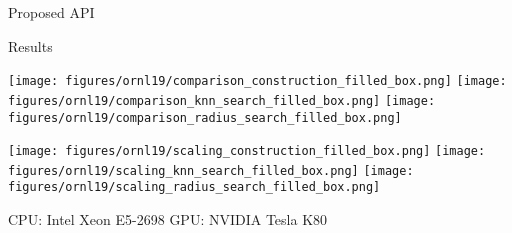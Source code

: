 \documentclass[final,hyperref={pdfpagelabels=false}]{beamer}
\begin{document}
\begin{frame}[t,fragile]
\begin{columns}[t]
\begin{column}{.480\textwidth}
\begin{block}{\centering Proposed API}
\end{block}

\begin{block}{\centering Results}

\texttt{[image: figures/ornl19/comparison\_construction\_filled\_box.png]}
\texttt{[image: figures/ornl19/comparison\_knn\_search\_filled\_box.png]}
\texttt{[image: figures/ornl19/comparison\_radius\_search\_filled\_box.png]}

\texttt{[image: figures/ornl19/scaling\_construction\_filled\_box.png]}
\texttt{[image: figures/ornl19/scaling\_knn\_search\_filled\_box.png]}
\texttt{[image: figures/ornl19/scaling\_radius\_search\_filled\_box.png]}

\begin{center}
  \small
  CPU: Intel Xeon E5-2698 \qquad GPU: NVIDIA Tesla K80
\end{center}


\end{block}


\end{column}
\end{columns}
\end{frame}
\end{document}
